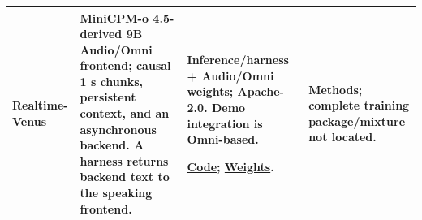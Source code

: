 \begin{table}[H]
\begin{tabular}{@{}>{\raggedright\arraybackslash}p{0.22\tablewidth}>{\raggedright\arraybackslash}p{0.43\tablewidth}>{\raggedright\arraybackslash}p{0.20\tablewidth}>{\raggedright\arraybackslash}p{0.15\tablewidth}@{}}
\addlinespace[4pt]
\textbf{Realtime-Venus}\par\citep{venus} & MiniCPM-o 4.5-derived 9B Audio/Omni frontend; causal 1 s chunks, persistent context, and an asynchronous backend. A harness returns backend text to the speaking frontend. & Inference/harness + Audio/Omni weights; Apache-2.0. Demo integration is Omni-based.\par \href{https://github.com/inclusionAI/Realtime-Venus}{Code}; \href{https://huggingface.co/inclusionAI/Realtime-Venus}{Weights}. & Methods; complete training package/mixture not located. \\
\bottomrule
\end{tabular}
\end{table}

